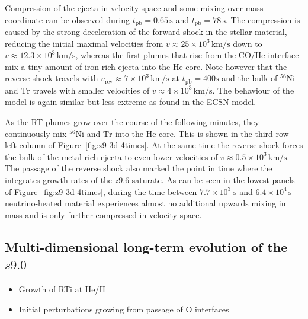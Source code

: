\documentclass[fleqn,usenatbib]{mnras}
\newcommand{\nickel}{\ensuremath{\mathrm{^{56}Ni}}\xspace}
\newcommand{\tracer}{\ensuremath{\mathrm{Tr}}\xspace}
\newcommand{\s}{\ensuremath{\text{s}}}
\newcommand{\COM}[1]{{\color{orange}#1}}
\begin{document}
Compression of the ejecta in velocity space and some mixing over mass coordinate can be observed during $t_{\mathrm{pb}}=0.65\,\text{s}$ and $t_{\mathrm{pb}}=78\,\s$. The compression is caused by the strong deceleration of the forward shock in the stellar material, reducing the initial maximal velocities from $v\approx 25\times10^3\,\mathrm{km/s}$ down to $v\approx 12.3\times10^3\,\mathrm{km/s}$, whereas the first plumes that rise from the CO/He interface mix a tiny amount of iron rich ejecta into the He-core. Note however that the reverse shock travels with $v_{\mathrm{rev}}\approx 7\times10^3\,\mathrm{km/s}$ at $t_{\mathrm{pb}}=400\s$ and the bulk of \nickel and \tracer travels with smaller velocities of $v\approx 4\times10^3\,\mathrm{km/s}$. The behaviour of the model is again similar but less extreme as found in the ECSN model.

As the RT-plumes grow over the course of the following minutes, they continuously mix \nickel and \tracer into the He-core. This is shown in the third row left column of Figure~\ref{fig:z9 3d 4times}. At the same time the reverse shock forces the bulk of the metal rich ejecta to even lower velocities of  $v\approx 0.5\times10^3\,\mathrm{km/s}$. The passage of the reverse shock also marked the point in time where the integrates growth rates of the $z9.6$ saturate. As can be seen in the lowest panels of Figure~\ref{fig:z9 3d 4times}, during the time between  $7.7\times 10^3\;\s$ and $6.4 \times 10^4\,\s$ neutrino-heated material experiences almost no additional upwards mixing in mass and is only further compressed in velocity space. 

\subsection{Multi-dimensional long-term evolution of the $s9.0$}
\label{sec:Multi-dimensional long-term simulations of the s9.0-model}
\COM{
\begin{itemize}
    \item Growth of RTi at He/H
    \item Initial perturbations growing from passage of O interfaces
\end{itemize}
}
\fi %
\end{document}

